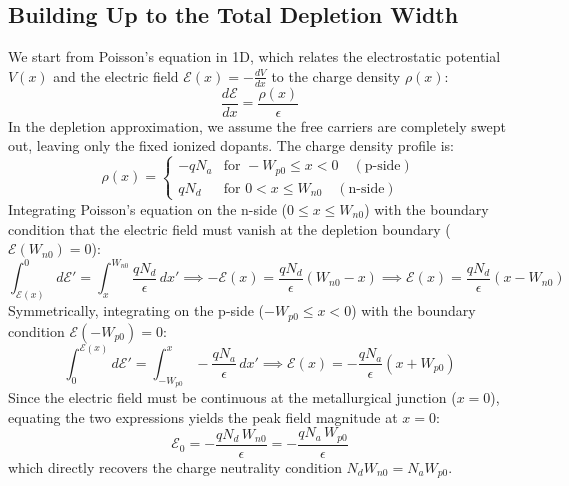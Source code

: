 \subsection{Building Up to the Total Depletion Width}

We start from Poisson's equation in 1D, which relates the electrostatic potential $V(x)$ and the electric field $\mathcal{E}(x) = -\frac{dV}{dx}$ to the charge density $\rho(x)$:
\begin{equation*}
    \frac{d\mathcal{E}}{dx} = \frac{\rho(x)}{\epsilon}
\end{equation*}
In the depletion approximation, we assume the free carriers are completely swept out, leaving only the fixed ionized dopants. The charge density profile is:
\begin{equation*}
    \rho(x) = 
    \begin{cases}
        -q N_a & \text{for } -W_{p0} \le x < 0 \quad (\text{p-side}) \\
        q N_d & \text{for } 0 < x \le W_{n0} \quad (\text{n-side})
    \end{cases}
\end{equation*}
Integrating Poisson's equation on the n-side ($0 \leq x \leq W_{n0}$) with the boundary condition that the electric field must vanish at the depletion boundary ($\mathcal{E}(W_{n0}) = 0$):
\begin{equation*}
    \int_{\mathcal{E}(x)}^{0} d\mathcal{E}' = \int_x^{W_{n0}} \frac{qN_d}{\epsilon}\,dx' \implies -\mathcal{E}(x) = \frac{qN_d}{\epsilon}(W_{n0} - x) \implies \mathcal{E}(x) = \frac{qN_d}{\epsilon}(x - W_{n0})
\end{equation*}
Symmetrically, integrating on the p-side ($-W_{p0} \leq x < 0$) with the boundary condition $\mathcal{E}(-W_{p0}) = 0$:
\begin{equation*}
    \int_0^{\mathcal{E}(x)} d\mathcal{E}' = \int_{-W_{p0}}^x -\frac{qN_a}{\epsilon}\,dx' \implies \mathcal{E}(x) = -\frac{qN_a}{\epsilon}(x + W_{p0})
\end{equation*}
Since the electric field must be continuous at the metallurgical junction ($x=0$), equating the two expressions yields the peak field magnitude at $x=0$:
\begin{equation*}
    \mathcal{E}_0 = -\frac{qN_d\,W_{n0}}{\epsilon} = -\frac{qN_a\,W_{p0}}{\epsilon}
\end{equation*}
which directly recovers the charge neutrality condition $N_d W_{n0} = N_a W_{p0}$.

